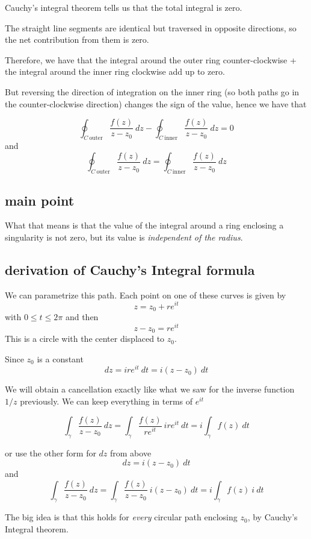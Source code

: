 \documentclass[11pt, oneside]{article}
\begin{document}
Cauchy's integral theorem tells us that the total integral is zero.

The straight line segments are identical but traversed in opposite directions, so the net contribution from them is zero.

Therefore, we have that the integral around the outer ring counter-clockwise + the integral around the inner ring clockwise add up to zero.

But reversing the direction of integration on the inner ring (so both paths go in the counter-clockwise direction) changes the sign of the value, hence we have that

\[ \oint_{C \ \text{outer}} \frac{f(z)}{z-z_0} \ dz - \oint_{C \ \text{inner}} \frac{f(z)}{z-z_0} \ dz = 0 \]
and
\[ \oint_{C \ \text{outer}} \frac{f(z)}{z-z_0} \ dz = \oint_{C \ \text{inner}} \frac{f(z)}{z-z_0} \ dz \]

\subsection*{main point}

What that means is that the value of the integral around a ring enclosing a singularity is not zero, but its value is \emph{independent of the radius}.

\subsection*{derivation of Cauchy's Integral formula}

We can parametrize this path.  Each point on one of these curves is given by
\[ z = z_0 + r e^{it} \]
with $0 \le t \le 2 \pi$ and then
\[ z - z_0 = r e^{it} \]
This is a circle with the center displaced to $z_0$.

Since $z_0$ is a constant
\[ dz = i r e^{it} \ dt = i (z - z_0) \ dt \]

We will obtain a cancellation exactly like what we saw for the inverse function $1/z$ previously.  We can keep everything in terms of $e^{it}$

\[ \int_{\gamma} \frac{f(z)}{z - z_0} \ dz = \int_{\gamma} \frac{f(z)}{re^{it}} \ ire^{it} \ dt = i \int_{\gamma} f(z) \ dt \]

or use the other form for $dz$ from above
\[ dz = i (z - z_0) \ dt \]
and
\[ \int_{\gamma} \frac{f(z)}{z - z_0} \ dz = \int_{\gamma} \frac{f(z)}{z - z_0} \ i(z - z_0) \ dt = i \int_{\gamma} f(z) \ i \ dt \]

The big idea is that this holds for \emph{every} circular path enclosing $z_0$, by Cauchy's Integral theorem.  
\end{document}
